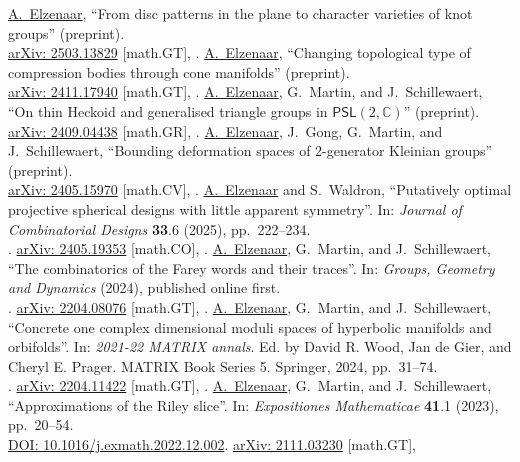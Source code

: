 \documentclass[a4paper,yyyy,nonstopmode,10pt]{simpleresumecv}
\begin{document}
\begin{Body}
\BigGap
\NumberedItem{[8]}
\underline{A.~Elzenaar}, ``From disc patterns in the plane to character varieties of knot groups'' (preprint).\\{\small\color{black!70}\href{https://arxiv.org/abs/2503.13829}{arXiv: 2503.13829} [math.GT],
.}
\Gap
\NumberedItem{[7]}
\underline{A.~Elzenaar}, ``Changing topological type of compression bodies through cone manifolds'' (preprint).\\{\small\color{black!70}\href{https://arxiv.org/abs/2411.17940}{arXiv: 2411.17940} [math.GT],
.}
\Gap
\NumberedItem{[6]}
\underline{A.~Elzenaar}, G.~Martin, and J.~Schillewaert, ``On thin Heckoid and generalised triangle groups in $\mathsf{PSL}(2,\mathbb{C}) $'' (preprint).\\{\small\color{black!70}\href{https://arxiv.org/abs/2409.04438}{arXiv: 2409.04438} [math.GR],
.}
\Gap
\NumberedItem{[5]}
\underline{A.~Elzenaar}, J.~Gong, G.~Martin, and J.~Schillewaert,
``Bounding deformation spaces of 2-generator Kleinian groups'' (preprint).\\{\small\color{black!70}
\href{https://arxiv.org/abs/2405.15970}{arXiv: 2405.15970} [math.CV],
.}
\Gap
\NumberedItem{[4]}
\underline{A.~Elzenaar} and S.~Waldron,
``Putatively optimal projective spherical designs with little apparent symmetry''. In: \textit{Journal of Combinatorial Designs} \textbf{33}.6 (2025), pp.~222--234.\\{\small\color{black!70}. \href{https://arxiv.org/abs/2405.19353}{arXiv: 2405.19353} [math.CO],
.}
\Gap
\NumberedItem{[3]}
\underline{A.~Elzenaar}, G.~Martin, and J.~Schillewaert,
``The combinatorics of the Farey words and their traces''. In: \textit{Groups, Geometry and Dynamics} (2024), published online first.\\{\small\color{black!70}. \href{https://arxiv.org/abs/2204.08076}{arXiv: 2204.08076} [math.GT],
.}
\Gap
\NumberedItem{[2]}
\underline{A.~Elzenaar}, G.~Martin, and J.~Schillewaert,
``Concrete one complex dimensional moduli spaces of hyperbolic manifolds and orbifolds''. In: \textit{2021-22 MATRIX annals}. Ed. by David R. Wood, Jan de Gier, and Cheryl E. Prager. MATRIX Book Series 5. Springer, 2024,
pp.~31--74.\\{\small\color{black!70}. \href{https://arxiv.org/abs/2204.08076}{arXiv: 2204.11422} [math.GT],
.}
\Gap
\NumberedItem{[1]}
\underline{A.~Elzenaar}, G.~Martin, and J.~Schillewaert,
``Approximations of the Riley slice''. In: \textit{Expositiones Mathematicae} \textbf{41}.1 (2023), pp.~20--54.\\{\small\color{black!70}\href{https://doi.org/10.1016/j.exmath.2022.12.002
}{DOI: 10.1016/j.exmath.2022.12.002}. \href{https://arxiv.org/abs/2111.03230}{arXiv: 2111.03230} [math.GT],
}



\end{Body}
\end{document}
